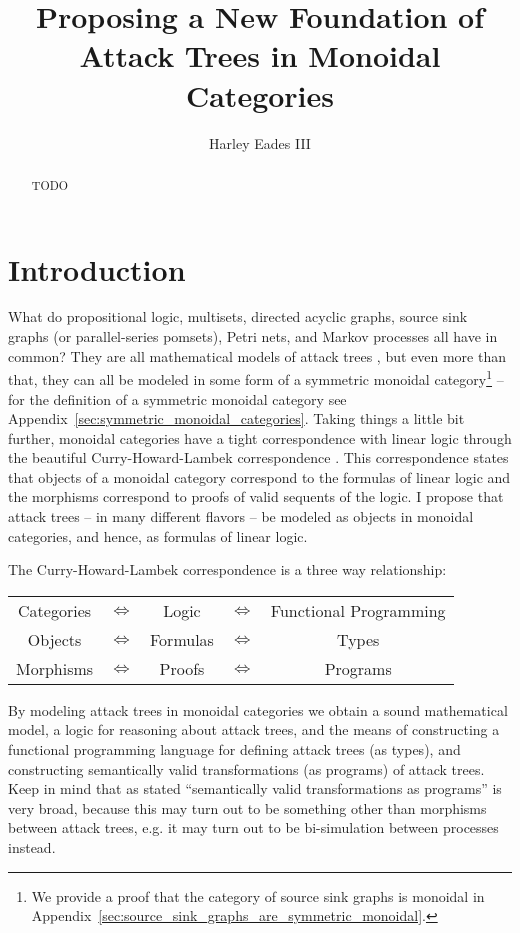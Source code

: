 \documentclass{llncs}
\date{}
\begin{document}
\title{Proposing a New Foundation of Attack Trees in Monoidal Categories}

\author{Harley Eades III}

\maketitle 

\begin{abstract}
  TODO
\end{abstract}

\section{Introduction}
\label{sec:introduction}

What do propositional logic, multisets, directed acyclic graphs,
source sink graphs (or parallel-series pomsets), Petri nets, and
Markov processes all have in common?  They are all mathematical models
of attack trees \cite{??}, but even more than that, they can all be
modeled in some form of a symmetric monoidal category\footnote{We
  provide a proof that the category of source sink graphs is monoidal
  in Appendix~\ref{sec:source_sink_graphs_are_symmetric_monoidal}.}
\cite{?} -- for the definition of a symmetric monoidal category see
Appendix~\ref{sec:symmetric_monoidal_categories}.  Taking things a
little bit further, monoidal categories have a tight correspondence
with linear logic through the beautiful Curry-Howard-Lambek
correspondence \cite{?}.  This correspondence states that objects of a
monoidal category correspond to the formulas of linear logic and the
morphisms correspond to proofs of valid sequents of the logic.  I
propose that attack trees -- in many different flavors -- be modeled
as objects in monoidal categories, and hence, as formulas of linear
logic.

The Curry-Howard-Lambek correspondence is a three way relationship:
\begin{center}
  \setlength{\tabcolsep}{7pt}
  \begin{tabular}{ccccc}
    Categories & $\iff$ & Logic    & $\iff$   & Functional Programming\\
    Objects    & $\iff$ & Formulas & $\iff$   & Types    \\
    Morphisms  & $\iff$ & Proofs   & $\iff$   & Programs 
  \end{tabular}
\end{center}
By modeling attack trees in monoidal categories we obtain a sound
mathematical model, a logic for reasoning about attack trees, and the
means of constructing a functional programming language for defining
attack trees (as types), and constructing semantically valid
transformations (as programs) of attack trees.  Keep in mind that as
stated ``semantically valid transformations as programs'' is very
broad, because this may turn out to be something other than morphisms
between attack trees, e.g. it may turn out to be bi-simulation between
processes instead.
\end{document}
